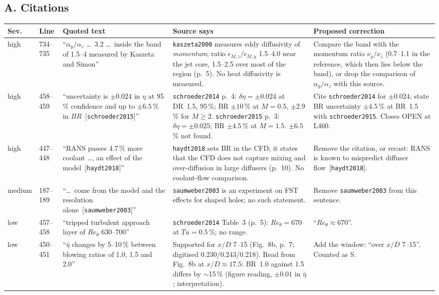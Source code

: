 \documentclass[10pt,a4paper]{article}
\newcommand*{\BR}{\mathit{BR}}
\newcommand*{\Reth}{\mathit{Re}_\theta}
\newcommand*{\etab}{\bar\eta}
\renewcommand{\cite}[1]{[\texttt{#1}]}
\newcommand{\vS}{\textsf{S}}
\begin{document}
\subsection*{A. Citations}
{\footnotesize
\begin{longtable}{@{}P{9mm} P{9mm} P{42mm} P{49mm} P{49mm}@{}}
\toprule
Sev. & Line & Quoted text & Source says & Proposed correction \\ \midrule\endhead
high & 734--735 & ``$\alpha_y/\alpha_z$ \dots\ 3.2 \dots\ inside the band of 1.5--4 measured by Kaszeta and Simon''
 & \texttt{kaszeta2000} measures eddy diffusivity of \emph{momentum}; ratio $\epsilon_{M,z}/\epsilon_{M,y}$ 1.5--4.0
   near the jet core, 1.5--2.5 over most of the region (p.~5). No heat diffusivity is measured.
 & Compare the band with the momentum ratio $\nu_y/\nu_z$ (0.7--1.1 in the reference, which then lies below the
   band), or drop the comparison of $\alpha_y/\alpha_z$ with this source. \\
high & 458--459 & ``uncertainty is $\pm0.024$ in $\eta$ at 95\,\% confidence and up to $\pm6.5$\,\% in
  $\BR$~\cite{schroeder2015}''
 & \texttt{schroeder2014} p.~4: $\delta\eta=\pm0.024$ at DR~1.5, 95\,\%; BR $\pm10$\,\% at $M=0.5$, $\pm2.9$\,\% for
   $M\ge2$. \texttt{schroeder2015} p.~3: $\delta\eta=\pm0.025$; BR $\pm4.5$\,\% at $M=1.5$. $\pm6.5$\,\% not found.
 & Cite \texttt{schroeder2014} for $\pm0.024$; state BR uncertainty $\pm4.5$\,\% at BR~1.5 with
   \texttt{schroeder2015}. Closes OPEN at L460. \\
high & 447--448 & ``RANS passes 4.7\,\% more coolant \dots, an effect of the model~\cite{haydt2018}''
 & \texttt{haydt2018} sets BR in the CFD; it states that the CFD does not capture mixing and over-diffusion in large
   diffusers (p.~10). No coolant-flow comparison.
 & Remove the citation, or recast: RANS is known to mispredict diffuser flow~\cite{haydt2018}. \\
medium & 187--189 & ``\dots\ come from the model and the resolution alone~\cite{saumweber2003}''
 & \texttt{saumweber2003} is an experiment on FST effects for shaped holes; no such statement.
 & Remove \texttt{saumweber2003} from this sentence. \\
low & 457--458 & ``tripped turbulent approach layer of $\Reth$ 630--700''
 & \texttt{schroeder2014} Table~3 (p.~5): $\Reth=670$ at $Tu=0.5$\,\%; no range.
 & ``$\Reth\approx670$''. \\
low & 450--451 & ``$\etab$ changes by 5--10\,\% between blowing ratios of 1.0, 1.5 and 2.0''
 & Supported for $x/D$ 7--15 (Fig.~8b, p.~7; digitised 0.230/0.243/0.218). Read from Fig.~8b at $x/D\approx17.5$:
   BR~1.0 against 1.5 differs by $\sim$15\,\% (figure reading, $\pm0.01$ in $\etab$; interpretation).
 & Add the window: ``over $x/D$ 7--15''. Counted as \vS. \\
\bottomrule
\end{longtable}}
\end{document}
